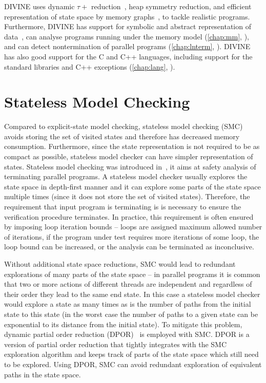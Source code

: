 DIVINE uses dynamic $\tau+$ reduction~\cite{TODO}, heap symmetry reduction, and
efficient representation of state space by memory graphs~\cite{RSCB2018}, to
tackle realistic programs.
Furthermore, DIVINE has support for symbolic and abstract representation of
data~\cite{TODO}, can analyse programs running under the \xtso memory model
(\autoref{chap:mm}, \cite{SB2018x86tso}), and can detect nontermination of
parallel programs (\autoref{chap:lnterm}, \cite{SB2019}).
DIVINE has also good support for the C and C++ languages, including support for
the standard libraries and C++ exceptions (\autoref{chap:lang},
\cite{SRB2017}).

\section{Stateless Model Checking}

Compared to explicit-state model checking, stateless model checking (SMC)
avoids storing the set of visited states and therefore has decreased memory
consumption.
Furthermore, since the state representation is not required to be as compact as
possible, stateless model checker can have simpler representation of states.
Stateless model checking was introduced in~\cite{Godefroid1997}, it aims at
safety analysis of terminating parallel programs.
A stateless model checker usually explores the state space in depth-first
manner and it can explore some parts of the state space multiple times (since
it does not store the set of visited states).
Therefore, the requirement that input program is terminating is is necessary
to ensure the verification procedure terminates.
In practice, this requirement is often ensured by imposing loop iteration
bounds -- loops are assigned maximum allowed number of iterations, if the
program under test requires more iterations of some loop, the loop bound can be
increased, or the analysis can be terminated as inconclusive.

Without additional state space reductions, SMC would lead to redundant
explorations of many parts of the state space -- in parallel programs it is
common that two or more actions of different threads are independent and
regardless of their order they lead to the same end state.
In this case a stateless model checker would explore a state as many times as
is the number of paths from the initial state to this state (in the worst case
the number of paths to a given state can be exponential to its distance from
the initial state).
To mitigate this problem, dynamic partial order reduction
(DPOR)~\cite{Flanagan2005dpor} is employed with SMC.
DPOR is a version of partial order reduction that tightly integrates with
the SMC exploration algorithm and keeps track of parts of the state space which
still need to be explored.
Using DPOR, SMC can avoid redundant exploration of equivalent paths in the
state space.

